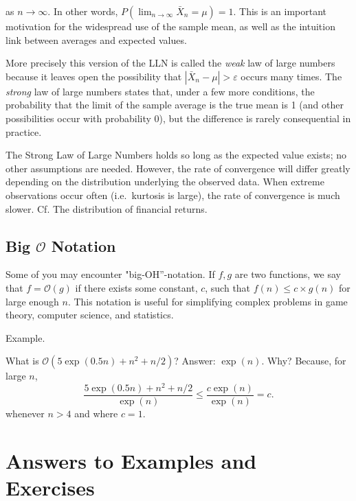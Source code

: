 \documentclass[
]{book}
\theoremstyle{definition}
\theoremstyle{definition}
\theoremstyle{definition}
\theoremstyle{definition}
\theoremstyle{remark}
\begin{document}
as \(n\to \infty\). In other words, \(P( \lim_{n\to\infty}\bar{X}_n = \mu) = 1\). This is an important motivation for the widespread use of the sample mean, as well as the intuition link between averages and expected values.

More precisely this version of the LLN is called the \emph{weak} law of large numbers because it leaves open the possibility that \(|\bar{X}_n - \mu | > \varepsilon\) occurs many times. The \emph{strong} law of large numbers states that, under a few more conditions, the probability that the limit of the sample average is the true mean is 1 (and other possibilities occur with probability 0), but the difference is rarely consequential in practice.

The Strong Law of Large Numbers holds so long as the expected value exists; no other assumptions are needed. However, the rate of convergence will differ greatly depending on the distribution underlying the observed data. When extreme observations occur often (i.e.~kurtosis is large), the rate of convergence is much slower. Cf. The distribution of financial returns.

\hypertarget{big-mathcalo-notation}{%
\subsection{\texorpdfstring{Big \(\mathcal{O}\) Notation}{Big \textbackslash mathcal\{O\} Notation}}\label{big-mathcalo-notation}}

Some of you may encounter "big-OH''-notation. If \(f, g\) are two functions, we say that \(f = \mathcal{O}(g)\) if there exists some constant, \(c\), such that \(f(n) \leq c \times g(n)\) for large enough \(n\). This notation is useful for simplifying complex problems in game theory, computer science, and statistics.

Example.

What is \(\mathcal{O}( 5\exp(0.5 n) + n^2 + n / 2)\)? Answer: \(\exp(n)\). Why? Because, for large \(n\),
\[
\frac{ 5\exp(0.5 n) + n^2 + n / 2 }{ \exp(n)} \leq \frac{ c \exp(n) }{ \exp(n)} = c. 
\]
whenever \(n > 4\) and where \(c = 1\).

\hypertarget{answers-to-examples-and-exercises-3}{%
\section*{Answers to Examples and Exercises}\label{answers-to-examples-and-exercises-3}}
\end{document}
